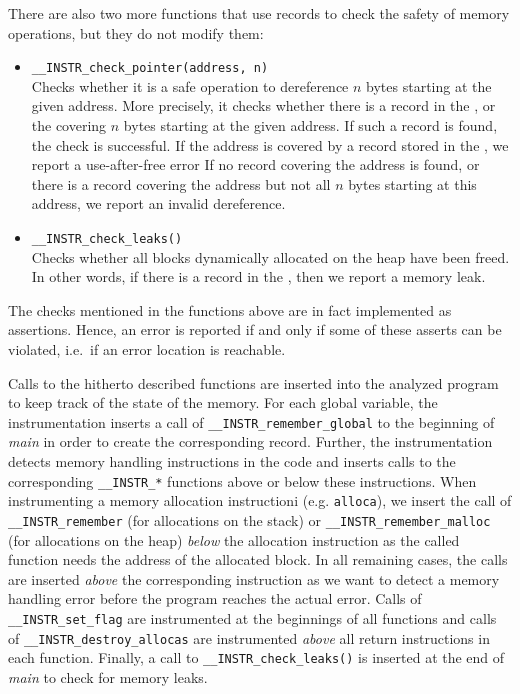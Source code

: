 There are also two more functions that use records to check
the safety of memory operations, but they do not modify them:
\begin{itemize}
\item \texttt{\_\_INSTR\_check\_pointer(address, n)}
  \\Checks whether it is a safe operation to dereference $n$ bytes
  starting at the given address. More precisely, it checks whether
  there is a record in the \stacklist, \heaplist or the \globalslist
  covering $n$ bytes starting at the given address.  If such a record
  is found, the check is successful. If the address is covered by a
  record stored in the \dealloclist, we report a use-after-free error
  If no record covering the address is found, or there is a record
  covering the address but not all $n$ bytes starting at this address,
  we report an invalid dereference.
\item \texttt{\_\_INSTR\_check\_leaks()}
  \\Checks whether all blocks dynamically allocated on the heap have been
  freed. In other words, if there is a record in the \heaplist, then we report
  a memory leak.
\end{itemize}

The checks mentioned in the functions above
are in fact implemented as assertions. Hence, an error is reported if
and only if some of these asserts can be violated, i.e.~if an error
location is reachable.

Calls to the hitherto described functions are inserted into the analyzed
program to keep track of the state of the memory.
For each global variable, the instrumentation inserts a call of
\texttt{\_\_INSTR\_remember\_global} to the beginning of \emph{main} in order
to create the corresponding record. Further, the instrumentation detects memory
handling instructions in the code and inserts calls to the corresponding
\texttt{\_\_INSTR\_*} functions above or below these instructions. When
instrumenting a memory allocation instructioni (e.g. \texttt{alloca}), we insert the call of
\texttt{\_\_INSTR\_remember} (for allocations on the stack) or
\texttt{\_\_INSTR\_remember\_malloc} (for allocations on the heap) \emph{below}
the allocation instruction as the called function needs the address of the
allocated block. In all remaining cases, the calls are inserted \emph{above} the
corresponding instruction as we want to detect a memory handling error before
the program reaches the actual error.
Calls of \texttt{\_\_INSTR\_set\_flag} are instrumented at the beginnings of
all functions and calls of \texttt{\_\_INSTR\_destroy\_allocas} are
instrumented \emph{above} all return instructions in each function. Finally, a
call to \texttt{\_\_INSTR\_check\_leaks()} is inserted at the end of
\emph{main} to check for memory leaks.


